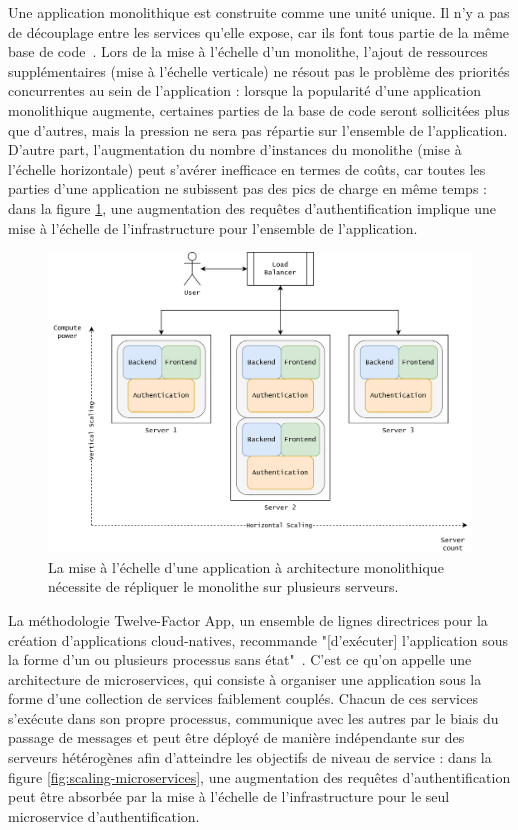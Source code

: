 Une application monolithique est construite comme une unité unique. Il n'y a pas de découplage entre les services qu'elle expose, car ils font tous partie de la même base de code~\cite{villamizarEvaluatingMonolithicMicroservice2015}. Lors de la mise à l'échelle d'un monolithe, l'ajout de ressources supplémentaires (mise à l'échelle verticale) ne résout pas le problème des priorités concurrentes au sein de l'application : lorsque la popularité d'une application monolithique augmente, certaines parties de la base de code seront sollicitées plus que d'autres, mais la pression ne sera pas répartie sur l'ensemble de l'application. D'autre part, l'augmentation du nombre d'instances du monolithe (mise à l'échelle horizontale) peut s'avérer inefficace en termes de coûts, car toutes les parties d'une application ne subissent pas des pics de charge en même temps : dans la figure \ref{fig:scaling-monolith}, une augmentation des requêtes d'authentification implique une mise à l'échelle de l'infrastructure pour l'ensemble de l'application.

\begin{figure}[ht]
    \centering
	\includegraphics[width=\textwidth]{2_Chapitre2/figures/scaling-monolith.png}
	\caption{La mise à l'échelle d'une application à architecture monolithique nécessite de répliquer le monolithe sur plusieurs serveurs.}
	\label{fig:scaling-monolith}
\end{figure}

La méthodologie Twelve-Factor App, un ensemble de lignes directrices pour la création d'applications cloud-natives, recommande "[d'exécuter] l'application sous la forme d'un ou plusieurs processus sans état"~\cite{12factor}. C'est ce qu'on appelle une architecture de microservices, qui consiste à organiser une application sous la forme d'une collection de services faiblement couplés. Chacun de ces services s'exécute dans son propre processus, communique avec les autres par le biais du passage de messages et peut être déployé de manière indépendante sur des serveurs hétérogènes afin d'atteindre les objectifs de niveau de service : dans la figure \ref{fig:scaling-microservices}, une augmentation des requêtes d'authentification peut être absorbée par la mise à l'échelle de l'infrastructure pour le seul microservice d'authentification.

